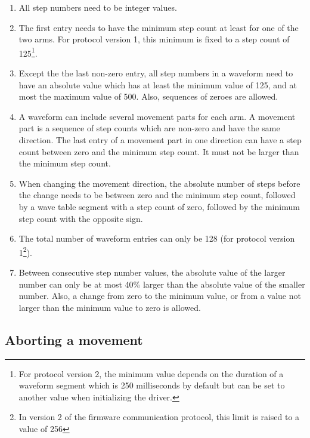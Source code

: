 \documentclass{scrartcl}[12pt,a4paper]
\begin{document}
\begin{enumerate}

\item All step numbers need to be integer values.

\item The first entry needs to have the minimum step count at least
  for one of the two arms.  For protocol version 1, this minimum is fixed to a
  step count of 125\footnote{For protocol version 2, the minimum value
    depends on the duration of a waveform segment which is 250
    milliseconds by default but can be set to another value when
    initializing the driver.}.
  
\item Except the the last non-zero entry, all step numbers in a
  waveform need to have an absolute value which has at least the
  minimum value of 125, and at most the maximum value of 500. Also,
  sequences of zeroes are allowed.

\item A waveform can include several movement parts for each arm. A
  movement part is a sequence of step counts which are non-zero and
  have the same direction. The last entry of a movement part in one
  direction can have a step count between zero and the minimum step
  count. It must not be larger than the minimum step count.

\item When changing the movement direction, the absolute number of
  steps before the change needs to be between zero and the minimum
  step count, followed by a wave table segment with a step count of
  zero, followed by the minimum step count with the opposite sign.

\item The total number of waveform entries can only be 128 (for
  protocol version 1\footnote{In version 2 of the firmware
    communication protocol, this limit is raised to a value of 256}).

\item Between consecutive step number values, the absolute value of
  the larger number can only be at most 40\% larger than the absolute
  value of the smaller number. Also, a change from zero to the minimum
  value, or from a value not larger than the minimum value to zero is
  allowed.

  
\end{enumerate}



\subsection{Aborting a movement}
\end{document}
